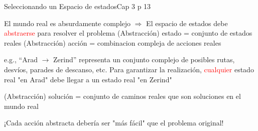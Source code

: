 \begin{frame}{Seleccionando un Espacio de estados}{Cap 3 p 13}
    
    El mundo real es absurdamente complejo \newline
    \hspace*{1em} $\Rightarrow$ El espacio de estados debe \textcolor{red}{abstraerse} para resolver el problema \newline
    (Abstracción) estado = conjunto de estados reales\newline
    (Abstracción) acción = combinacion compleja de acciones reales\newline
   
    \hspace*{1em} e.g., “Arad $\rightarrow$ Zerind” representa un conjunto complejo de posibles rutas, desvíos, parades de descanso, etc. \newline
    Para garantizar la realización, \textcolor{red}{cualquier} estado real "en Arad" debe llegar a un estado real "en Zerind"\newline
    
    (Abstracción) solución = \newline
    \hspace*{1em} conjunto de caminos reales que son soluciones en el mundo real
    
    ¡Cada acción abstracta debería ser "más fácil" que el problema original!    
    
\end{frame}
